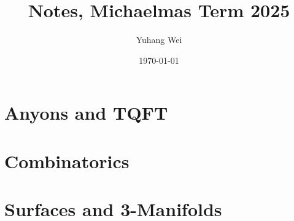 \documentclass[11pt,a4paper]{book}
\theoremstyle{plain} %
\theoremstyle{definition} %
\theoremstyle{claimstyle}
\begin{document}
\title{Notes, Michaelmas Term 2025}
\author{Yuhang Wei}
\date{\today}
\maketitle
\tableofcontents


\chapter{Anyons and TQFT}




\chapter{Combinatorics}


\chapter{Surfaces and 3-Manifolds}



\newpage
\printbibliography
\end{document}
